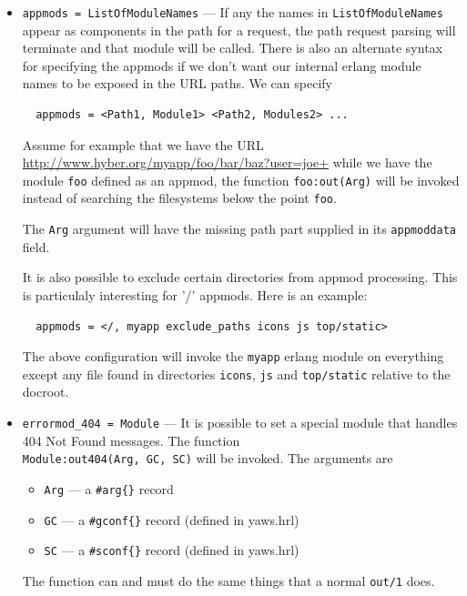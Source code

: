 \documentclass[11pt,oneside,english]{book}
\begin{document}
\begin{itemize}
\item       \verb+appmods = ListOfModuleNames+ ---
             If any the names in \verb+ListOfModuleNames+ appear as components
             in the path for a request, the path request parsing will terminate
             and that module will be called. There is also an alternate syntax
             for specifying the appmods if we don't want our internal erlang
             module names to be exposed in the URL paths.  We can specify
\begin{verbatim}
  appmods = <Path1, Module1> <Path2, Modules2> ...
\end{verbatim}
             Assume for example that we have the URL
             \url{http://www.hyber.org/myapp/foo/bar/baz?user=joe+} while we
             have the module \verb+foo+ defined as an appmod, the function
             \verb+foo:out(Arg)+ will be invoked instead of searching the
             filesystems below the point \verb+foo+.

             The \verb+Arg+ argument will have the missing path part supplied in
             its \verb+appmoddata+ field.

             It is also possible to exclude certain directories from appmod
             processing. This is particulaly interesting for '/' appmods.  Here
             is an example:
\begin{verbatim}
  appmods = </, myapp exclude_paths icons js top/static>
\end{verbatim}
             The above configuration will invoke the \verb+myapp+ erlang module
             on everything except any file found in directories \verb+icons+,
             \verb+js+ and \verb+top/static+ relative to the docroot.

\item       \verb+errormod_404 = Module+ ---
              It is possible to set a special module that handles 404 Not Found
              messages. The function\\ \verb+Module:out404(Arg, GC, SC)+ will be
              invoked. The arguments are
              \begin{itemize}
              \item \verb+Arg+ --- a \verb+#arg{}+ record
              \item \verb+GC+ --- a \verb+#gconf{}+ record (defined in yaws.hrl)
              \item \verb+SC+ --- a \verb+#sconf{}+ record (defined in yaws.hrl)
              \end{itemize}
              The function can and must do the same things that a normal
              \verb+out/1+ does.


\end{itemize}
\end{document}
